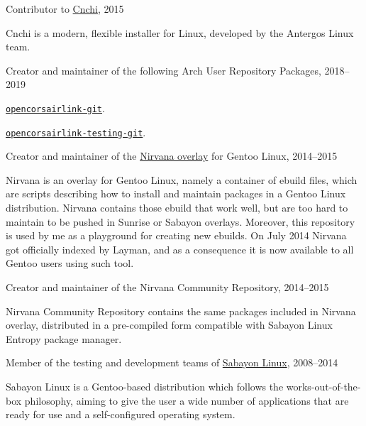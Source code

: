 \documentclass[10pt]{article}
\newenvironment{innerlist}[1][\enskip\textbullet]%
        {\begin{compactitem}[#1]}{\end{compactitem}}
\newcommand{\halfblankline}{\quad\vspace{-0.5\baselineskip}\pagebreak[3]}
\begin{document}
Contributor to \href{https://github.com/Antergos/Cnchi}{Cnchi}, 2015
\begin{innerlist}
    \item Cnchi is a modern, flexible installer for Linux, developed by the Antergos Linux team.
\end{innerlist}
\halfblankline

Creator and maintainer of the following Arch User Repository Packages, 2018--2019
\begin{innerlist}
    \item \href{https://aur.archlinux.org/packages/opencorsairlink-git/}{\texttt{opencorsairlink-git}}.
    \item \href{https://aur.archlinux.org/packages/opencorsairlink-testing-git/}{\texttt{opencorsairlink-testing-git}}.
\end{innerlist}
\halfblankline

Creator and maintainer of the \href{https://bitbucket.org/danysk/nirvana-overlay/}{Nirvana overlay} for Gentoo Linux, 2014--2015
\begin{innerlist}
    \item Nirvana is an overlay for Gentoo Linux, namely a container of ebuild files, which are scripts describing how to install and maintain packages in a Gentoo Linux distribution. Nirvana contains those ebuild that work well, but are too hard to maintain to be pushed in Sunrise or Sabayon overlays. Moreover, this repository is used by me as a playground for creating new ebuilds. On July 2014 Nirvana got officially indexed by Layman, and as a consequence it is now available to all Gentoo users using such tool.
\end{innerlist}
\halfblankline

Creator and maintainer of the {Nirvana Community Repository}, 2014--2015
\begin{innerlist}
    \item Nirvana Community Repository contains the same packages included in Nirvana overlay, distributed in a pre-compiled form compatible with Sabayon Linux Entropy package manager.
\end{innerlist}
\halfblankline

Member of the testing and development teams of \href{http://www.sabayon.org/}{Sabayon Linux}, 2008--2014
\begin{innerlist}
  \item Sabayon Linux is a Gentoo-based distribution which follows the works-out-of-the-box philosophy, aiming to give the user a wide number of applications that are ready for use and a self-configured operating system.
\end{innerlist}
\halfblankline
\end{document}
